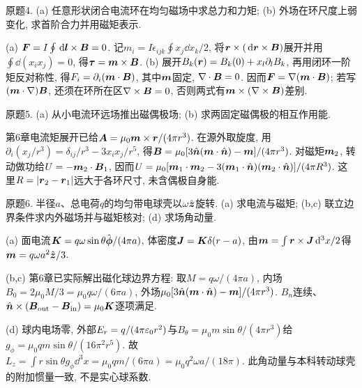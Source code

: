 \begin{exercise}
原题4. (a) 任意形状闭合电流环在均匀磁场中求总力和力矩; (b) 外场在环尺度上弱变化, 求首阶合力并用磁矩表示.
\end{exercise}
\begin{solution}
(a) $\boldsymbol{F}=I\oint\,\mathrm d\boldsymbol{l}\times\boldsymbol{B}=0$. 记$m_i=I\epsilon_{ijk}\oint x_j\dd x_k/2$, 将$\boldsymbol{r}\times(\,\mathrm d\boldsymbol{r}\times\boldsymbol{B})$展开并用$\oint\dd(x_ix_j)=0$, 得$\boldsymbol{\tau}=\boldsymbol{m}\times\boldsymbol{B}$. (b) 展开$B_k(\boldsymbol{r})=B_k(0)+x_l\partial_lB_k$, 再用闭环一阶矩反对称性, 得$F_i=\partial_i(\boldsymbol{m}\cdot\boldsymbol{B})$, 其中$\boldsymbol{m}$固定, $\nabla\cdot\boldsymbol{B}=0$. 因而$\boldsymbol{F}=\nabla(\boldsymbol{m}\cdot\boldsymbol{B})$; 若写$(\boldsymbol{m}\cdot\nabla)\boldsymbol{B}$, 还须在环所在区$\nabla\times\boldsymbol{B}=0$, 否则两式有$\boldsymbol{m}\times(\nabla\times\boldsymbol{B})$差别.
\end{solution}
\begin{exercise}
原题5. (a) 从小电流环远场推出磁偶极场; (b) 求两固定磁偶极的相互作用能.
\end{exercise}
\begin{solution}
第6章电流矩展开已给$\boldsymbol{A}=\mu_0\boldsymbol{m}\times\boldsymbol{r}/(4\pi r^3)$. 在源外取旋度, 用$\partial_i(x_j/r^3)=\delta_{ij}/r^3-3x_ix_j/r^5$, 得$\boldsymbol{B}=\mu_0[3\hat{\boldsymbol{n}}(\boldsymbol{m}\cdot\hat{\boldsymbol{n}})-\boldsymbol{m}]/(4\pi r^3)$. 对磁矩$\boldsymbol{m}_2$, 转动做功给$U=-\boldsymbol{m}_2\cdot\boldsymbol{B}_1$, 因而$U=\mu_0[\boldsymbol{m}_1\cdot\boldsymbol{m}_2-3(\boldsymbol{m}_1\cdot\hat{\boldsymbol{n}})(\boldsymbol{m}_2\cdot\hat{\boldsymbol{n}})]/(4\pi R^3)$. 这里$R=|\boldsymbol{r}_2-\boldsymbol{r}_1|$远大于各环尺寸, 未含偶极自身能.
\end{solution}
\begin{exercise}
原题6. 半径$a$、总电荷$q$的均匀带电球壳以$\omega\hat{\boldsymbol{z}}$旋转. (a) 求电流与磁矩; (b,c) 联立边界条件求内外磁场并与磁矩核对; (d) 求场角动量.
\end{exercise}
\begin{solution}
(a) 面电流$\boldsymbol{K}=q\omega\sin\theta\hat{\boldsymbol{\phi}}/(4\pi a)$, 体密度$\boldsymbol{J}=\boldsymbol{K}\delta(r-a)$, 由$\boldsymbol{m}=\int\boldsymbol{r}\times\boldsymbol{J}\,\mathrm d^3x/2$得$\boldsymbol{m}=q\omega a^2\hat{\boldsymbol{z}}/3$.

(b,c) 第6章已实际解出磁化球边界方程: 取$M=q\omega/(4\pi a)$, 内场$B_0=2\mu_0M/3=\mu_0q\omega/(6\pi a)$, 外场$\mu_0[3\hat{\boldsymbol{n}}(\boldsymbol{m}\cdot\hat{\boldsymbol{n}})-\boldsymbol{m}]/(4\pi r^3)$. $B_n$连续、$\hat{\boldsymbol{n}}\times(\boldsymbol{B}_{\rm out}-\boldsymbol{B}_{\rm in})=\mu_0\boldsymbol{K}$逐项满足.

(d) 球内电场零, 外部$E_r=q/(4\pi\varepsilon_0 r^2)$与$B_\theta=\mu_0m\sin\theta/(4\pi r^3)$给$g_\phi=\mu_0qm\sin\theta/(16\pi^2r^5)$. 故$L_z=\int r\sin\theta g_\phi\dd^3x=\mu_0qm/(6\pi a)=\mu_0q^2\omega a/(18\pi)$. 此角动量与本科转动球壳的附加惯量一致, 不是实心球系数.
\end{solution}
